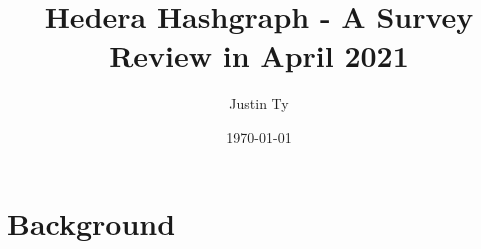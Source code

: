 \documentclass{article}
\begin{document}

\author{Justin Ty}
\title{Hedera Hashgraph - A Survey Review in April 2021 }
\date{\today}

\maketitle


\section{Background}
\cite{einstein}
\printbibliography

\end{document}
